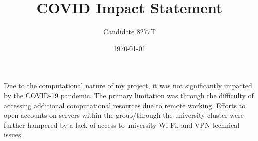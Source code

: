\documentclass[11pt,a4paper]{article}
\title{COVID Impact Statement}
\author{Candidate 8277T}
\date{\today}
\begin{document}
	
\maketitle %

Due to the computational nature of my project, it was not significantly impacted by the COVID-19 pandemic. The primary limitation was through the difficulty of accessing additional computational resources due to remote working. Efforts to open accounts on servers within the group/through the university cluster were further hampered by a lack of access to university Wi-Fi, and VPN technical issues.
\end{document}
